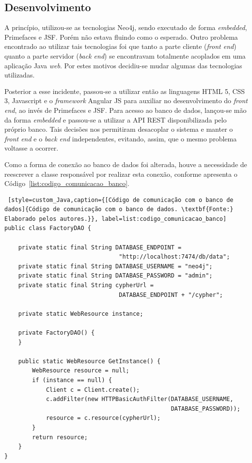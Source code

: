 \subsection{Desenvolvimento}

\par A princípio, utilizou-se as tecnologias Neo4j, sendo executado de forma \textit{embedded}, Primefaces e JSF. Porém não estava fluindo como o esperado. Outro problema encontrado ao utilizar tais tecnologias foi que tanto a parte cliente (\textit{front end}) quanto a parte servidor (\textit{back end}) se encontravam totalmente acoplados em uma aplicação Java \textit{web}. Por estes motivos decidiu-se mudar algumas das tecnologias utilizadas.

\par Posterior a esse incidente, passou-se a utilizar então as linguagens HTML 5, CSS 3, Javascript e o \textit{framework} Angular JS para auxiliar no desenvolvimento do \textit{front end}, ao invés de Primefaces e JSF. Para acesso ao banco de dados, lançou-se mão da forma \textit{embedded} e passou-se a utilizar a API REST disponibilizada pelo próprio banco. Tais decisões nos permitiram desacoplar o sistema e manter o \textit{front end} e o \textit{back end} independentes, evitando, assim, que o mesmo problema voltasse a ocorrer.

\par Como a forma de conexão ao banco de dados foi alterada, houve a necessidade de reescrever a classe responsável por realizar esta conexão, conforme apresenta o Código~\ref{list:codigo_comunicacao_banco}.

\begin{lstlisting} [style=custom_Java,caption={[Código de comunicação com o banco de dados]{Código de comunicação com o banco de dados. \textbf{Fonte:} Elaborado pelos autores.}}, label=list:codigo_comunicacao_banco] 	
public class FactoryDAO {

	private static final String DATABASE_ENDPOINT =
								 "http://localhost:7474/db/data";
	private static final String DATABASE_USERNAME = "neo4j";
	private static final String DATABASE_PASSWORD = "admin";
	private static final String cypherUrl = 
								 DATABASE_ENDPOINT + "/cypher";
	
	private static WebResource instance;
	
	private FactoryDAO() {
	}
	
	public static WebResource GetInstance() {
		WebResource resource = null;
		if (instance == null) {
			Client c = Client.create();
			c.addFilter(new HTTPBasicAuthFilter(DATABASE_USERNAME,
												DATABASE_PASSWORD));
			resource = c.resource(cypherUrl);
		}
		return resource;
	}
}
\end{lstlisting}


